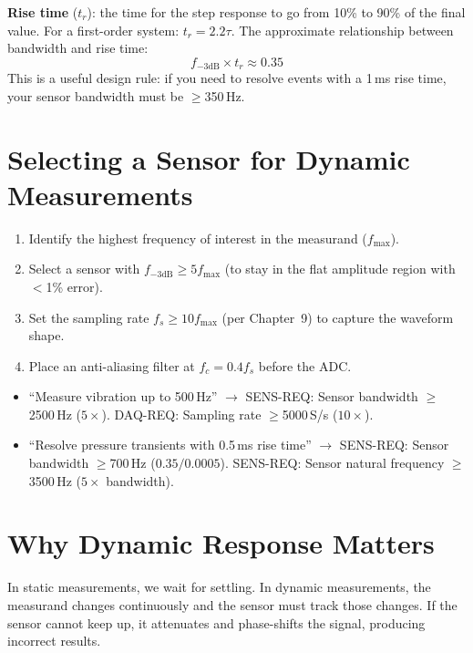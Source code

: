 \documentclass[11pt,letterpaper,twoside,openany]{book}
\begin{document}
\textbf{Rise time} ($t_r$): the time for the step response to go from 10\% to 90\% of the final value. For a first-order system: $t_r = 2.2\tau$. The approximate relationship between bandwidth and rise time:
\begin{equation}
f_{-3\text{dB}} \times t_r \approx 0.35
\end{equation}
This is a useful design rule: if you need to resolve events with a 1\,ms rise time, your sensor bandwidth must be $\geq$350\,Hz.

\section{Selecting a Sensor for Dynamic Measurements}
\begin{enumerate}[leftmargin=1.5em]
\item Identify the highest frequency of interest in the measurand ($f_{\max}$).
\item Select a sensor with $f_{-3\text{dB}} \geq 5 f_{\max}$ (to stay in the flat amplitude region with $<$1\% error).
\item Set the sampling rate $f_s \geq 10 f_{\max}$ (per Chapter~9) to capture the waveform shape.
\item Place an anti-aliasing filter at $f_c = 0.4 f_s$ before the ADC.
\end{enumerate}

\begin{keyconceptbox}
\begin{itemize}[nosep,leftmargin=1.5em]
\item ``Measure vibration up to 500\,Hz'' $\to$ SENS-REQ: Sensor bandwidth $\geq$2500\,Hz ($5\times$). DAQ-REQ: Sampling rate $\geq$5000\,S/s ($10\times$).
\item ``Resolve pressure transients with 0.5\,ms rise time'' $\to$ SENS-REQ: Sensor bandwidth $\geq$700\,Hz ($0.35/0.0005$). SENS-REQ: Sensor natural frequency $\geq$3500\,Hz ($5\times$ bandwidth).
\end{itemize}
\end{keyconceptbox}


\section{Why Dynamic Response Matters}
In static measurements, we wait for settling. In dynamic measurements, the measurand changes continuously and the sensor must track those changes. If the sensor cannot keep up, it attenuates and phase-shifts the signal, producing incorrect results.
\end{document}
